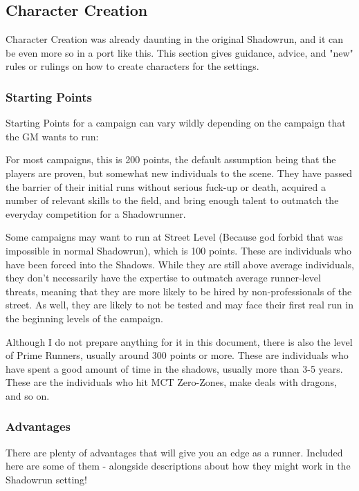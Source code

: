 \begin{multicols}{3}
	\subsection{Character Creation}
	
	Character Creation was already daunting in the original Shadowrun, and it can be even more so in a port like this. This section gives guidance, advice, and "new" rules or rulings on how to create characters for the settings.
	
	\subsubsection{Starting Points}
	
	Starting Points for a campaign can vary wildly depending on the campaign that the GM wants to run: 
	
	For most campaigns, this is 200 points, the default assumption being that the players are proven, but somewhat new individuals to the scene. They have passed the barrier of their initial runs without serious fuck-up or death, acquired a number of relevant skills to the field, and bring enough talent to outmatch the everyday competition for a Shadowrunner.
	
	Some campaigns may want to run at Street Level (Because god forbid that was impossible in normal Shadowrun), which is 100 points. These are individuals who have been forced into the Shadows. While they are still above average individuals, they don't necessarily have the expertise to outmatch average runner-level threats, meaning that they are more likely to be hired by non-professionals of the street. As well, they are likely to not be tested and may face their first real run in the beginning levels of the campaign.
	
	Although I do not prepare anything for it in this document, there is also the level of Prime Runners, usually around 300 points or more. These are individuals who have spent a good amount of time in the shadows, usually more than 3-5 years. These are the individuals who hit MCT Zero-Zones, make deals with dragons, and so on.
	
	\subsubsection{Advantages}
	
	There are plenty of  advantages that will give you an edge as a runner. Included here are some of them - alongside descriptions about how they might work in the Shadowrun setting!
	

\end{multicols}
